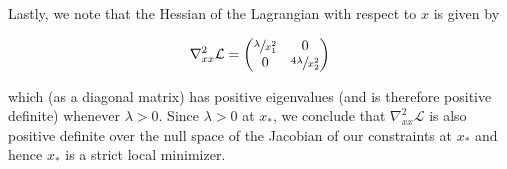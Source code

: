 \begin{solution}
    Lastly, we note that the Hessian of the Lagrangian with respect to $x$ is given by

    $$
    \nabla^2_{xx} \mathcal{L} = \begin{pmatrix*}
        \sfrac{\lambda}{x_1^2} & 0 \\
        0                      & \sfrac{4 \lambda}{x_2^2}
    \end{pmatrix*}
    $$

    which (as a diagonal matrix) has positive eigenvalues (and is therefore positive definite) whenever $\lambda > 0$. 
    Since $\lambda > 0$ at $x_*$, we conclude that $\nabla^2_{xx} \mathcal{L}$ is also positive definite over the null 
    space of the Jacobian of our constraints at $x_*$ and hence $x_*$ is a strict local minimizer.
    \ \\
\end{solution}